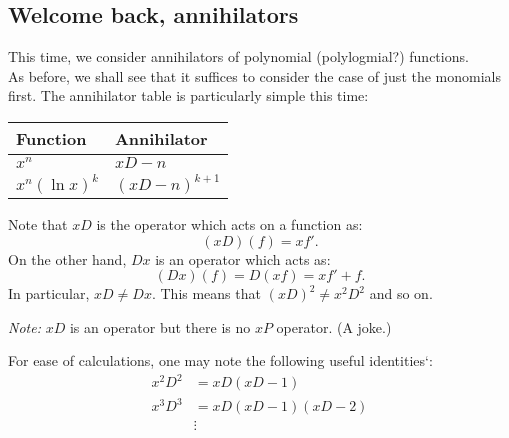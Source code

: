 \subsection{Welcome back, annihilators}
This time, we consider annihilators of polynomial (polylogmial?) functions.\\
As before, we shall see that it suffices to consider the case of just the monomials first. The annihilator table is particularly simple this time:
\begin{mdframed}[style=boxstyle, frametitle={Annihilators of special functions}]
	\begin{center}
	\bgroup
	\def\arraystretch{1.25}
	\begin{tabular}{|l|l|}
		\hline
		Function & Annihilator\\
		\hline
		$x^n$ & $xD - n$\\
		$x^n(\ln x)^k$ & $(xD - n)^{k+1}$\\
		\hline
	\end{tabular}
	\egroup
	\end{center}
\end{mdframed}
\begin{mdframed}[style=boxstyle, frametitle={A word on $xD$}]
	Note that $xD$ is the operator which acts on a function as:
	\begin{equation*} 
		(xD)(f) = xf'.
	\end{equation*}
	On the other hand, $Dx$ is an operator which acts as:
	\begin{equation*} 
		(Dx)(f) = D(xf) = xf' + f.
	\end{equation*}
	In particular, $xD \neq Dx.$ This means that $(xD)^2 \neq x^2D^2$ and so on.
\end{mdframed}
\emph{Note:} $xD$ is an operator but there is no $xP$ operator. \hfill (A joke.)
\begin{mdframed}[style=boxstyle, frametitle={Some arithmetic}]
	For ease of calculations, one may note the following useful identities`:
	\begin{align*} 
		x^2D^2 &= xD(xD - 1)\\
		x^3D^3 &= xD(xD - 1)(xD - 2)\\
		&\vdots
	\end{align*}
\end{mdframed}
